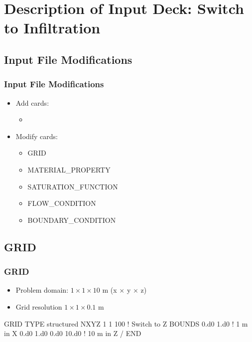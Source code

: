 \documentclass{beamer}
\newcommand\bluecomment[1]{{{\color{blue} #1}}}
\newcommand\magentacomment[1]{{{\color{magenta} #1}}}
\begin{document}
\section{Description of Input Deck: Switch to Infiltration}

\subsection{Input File Modifications}

\begin{frame}[fragile]\frametitle{Input File Modifications}

\begin{itemize}
\item Add cards:
  \begin{itemize}
    \item
  \end{itemize}
\item Modify cards:
  \begin{itemize}
    \item GRID
    \item MATERIAL\_PROPERTY
    \item SATURATION\_FUNCTION
    \item FLOW\_CONDITION
    \item BOUNDARY\_CONDITION
   \end{itemize}
\end{itemize}

\end{frame}

\subsection{GRID}
\begin{frame}\frametitle{GRID}

\begin{itemize}
  \item Problem domain: $1 \times 1 \times 10$ m (x $\times$ y $\times$ z)
  \item Grid resolution $1 \times 1 \times 0.1$ m
\end{itemize}

\begin{semiverbatim}
GRID
  TYPE structured
  NXYZ \magentacomment{1} 1 \magentacomment{100}     \bluecomment{! Switch to Z}
  BOUNDS
    0.d0 \magentacomment{1.d0}      \bluecomment{! 1 m in X}
    0.d0 1.d0
    0.d0 \magentacomment{10.d0}     \bluecomment{! 10 m in Z}
  /
END
\end{semiverbatim}

\end{frame}
\end{document}
